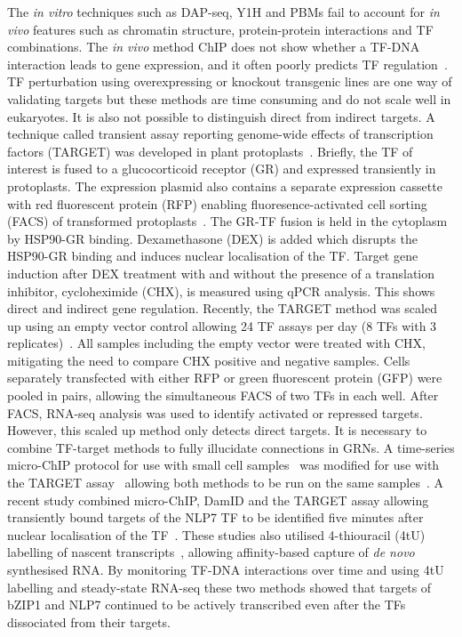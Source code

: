 The \textit{in vitro} techniques such as DAP-seq, Y1H and PBMs fail to account for \textit{in vivo} features such as chromatin structure, protein-protein interactions and TF combinations.
The \textit{in vivo} method ChIP does not show whether a TF-DNA interaction leads to gene expression, and it often poorly predicts TF regulation~\autocite{brooksNetworkWalkingCharts2019}.
TF perturbation using overexpressing or knockout transgenic lines are one way of validating targets but these methods are time consuming and do not scale well in eukaryotes.
It is also not possible to distinguish direct from indirect targets.
A technique called transient assay reporting genome\hyp{}wide effects of transcription factors (TARGET) was developed in plant protoplasts~\autocite{bargmannTARGETTransientTransformation2013}.
Briefly, the TF of interest is fused to a glucocorticoid receptor (GR) and expressed transiently in protoplasts.
The expression plasmid also contains a separate expression cassette with red fluorescent protein (RFP) enabling fluoresence\hyp{}activated cell sorting (FACS) of transformed protoplasts~\autocite{bargmannFluorescenceActivatedCell2010}.
The GR-TF fusion is held in the cytoplasm by HSP90-GR binding. Dexamethasone (DEX) is added which disrupts the HSP90-GR binding and induces nuclear localisation of the TF.
Target gene induction after DEX treatment with and without the presence of a translation inhibitor, cycloheximide (CHX), is measured using qPCR analysis.
This shows direct and indirect gene regulation.
Recently, the TARGET method was scaled up using an empty vector control allowing 24 TF assays per day (8 TFs with 3 replicates)~\autocite{brooksNetworkWalkingCharts2019}.
All samples including the empty vector were treated with CHX, mitigating the need to compare CHX positive and negative samples.
Cells separately transfected with either RFP or green fluorescent protein (GFP) were pooled in pairs, allowing the simultaneous FACS of two TFs in each well.
After FACS, RNA-seq analysis was used to identify activated or repressed targets.
However, this scaled up method only detects direct targets.
It is necessary to combine TF-target methods to fully illucidate connections in GRNs.
A time\hyp{}series micro-ChIP protocol for use with small cell samples~\autocite{dahlMChIPRapidMicro2008} was modified for use with the TARGET assay~\autocite{paraMChIPSeqGenomeWideMapping2018} allowing both methods to be run on the same samples~\autocite{paraHitandrunTranscriptionalControl2014, doidyHitandRunTranscriptionNovo2016}.
A recent study combined micro-ChIP, DamID and the TARGET assay allowing transiently bound targets of the NLP7 TF to be identified five minutes after nuclear localisation of the TF~\autocite{alvarezTransientGenomewideInteractions2020}.
These studies also utilised 4-thiouracil (4tU) labelling of nascent transcripts~\autocite{sidaway-leeDirectMeasurementTranscription2014}, allowing affinity-based capture of \textit{de novo} synthesised RNA.
By monitoring TF-DNA interactions over time and using 4tU labelling and steady\hyp{}state RNA-seq these two methods showed that targets of bZIP1 and NLP7 continued to be actively transcribed even after the TFs dissociated from their targets.

